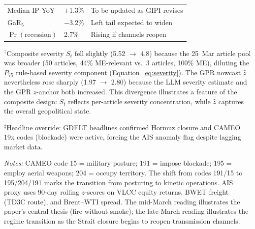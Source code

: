 \documentclass[12pt]{article}
\begin{document}
\begin{table}[htbp]
\begin{center}
\begin{threeparttable}
\begin{tabular}{@{}p{4.0cm} p{3.0cm} p{3.0cm} p{3.5cm}@{}}
Median IP YoY & $+1.3\%$ & \multicolumn{2}{l}{To be updated as GIPI revises}\\
GaR$_5$ & $-3.2\%$ & \multicolumn{2}{l}{Left tail expected to widen}\\
$\Pr(\text{recession})$ & 2.7\% & \multicolumn{2}{l}{Rising if channels reopen}\\
\bottomrule
\end{tabular}
\begin{tablenotes}[flushleft]\footnotesize
\item $^{\dagger}$Composite severity $S_t$ fell slightly (5.52 $\to$ 4.8)
because the 25~Mar article pool was broader (50 articles, 44\% ME-relevant
vs.\ 3 articles, 100\% ME), diluting the $P_{75}$ rule-based severity
component (Equation~\ref{eq:severity}).
The GPR nowcast $\hat{z}$ nevertheless rose sharply (1.97 $\to$ 2.80)
because the LLM severity estimate and the GPR $z$-anchor both increased.
This divergence illustrates a feature of the composite design:
$S_t$ reflects per-article severity concentration, while $\hat{z}$
captures the overall geopolitical state.
\item $^{\ddagger}$Headline override: GDELT headlines confirmed Hormuz closure
and CAMEO 19x codes (blockade) were active, forcing the AIS anomaly flag
despite lagging market data.
\item \textit{Notes:}
CAMEO code 15 = military posture; 191 = impose blockade;
195 = employ aerial weapons; 204 = occupy territory.
The shift from codes 191/15 to 195/204/191 marks the transition from
posturing to kinetic operations.
AIS proxy uses 90-day rolling $z$-scores on VLCC equity returns,
BWET freight (TD3C route), and Brent--WTI spread.
The mid-March reading illustrates the paper's central thesis
(fire without smoke); the late-March reading illustrates the regime
transition as the Strait closure begins to reopen transmission channels.
\end{tablenotes}
\end{threeparttable}
\end{center}
\end{table}
\end{document}

